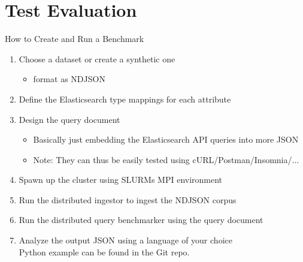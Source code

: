 \documentclass[compress,aspectratio=169]{beamer}
\begin{document}
	\section{Test Evaluation}
  \begin{frame}{How to Create and Run a Benchmark}
    \begin{enumerate}
      \item Choose a dataset or create a synthetic one
        \begin{itemize}
          \item format as NDJSON
        \end{itemize}
        \pause
      \item Define the Elasticsearch type mappings for each attribute
        \pause
      \item Design the query document
        \begin{itemize}
          \item Basically just embedding the Elasticsearch API queries into more JSON
          \item Note: They can thus be easily tested using cURL/Postman/Insomnia/...
        \end{itemize}
        \pause
      \item Spawn up the cluster using SLURMs MPI environment
        \pause
      \item Run the distributed ingestor to ingest the NDJSON corpus
        \pause
      \item Run the distributed query benchmarker using the query document
        \pause
      \item Analyze the output JSON using a language of your choice\\
        Python example can be found in the Git repo.
    \end{enumerate}
  \end{frame}
\end{document}
